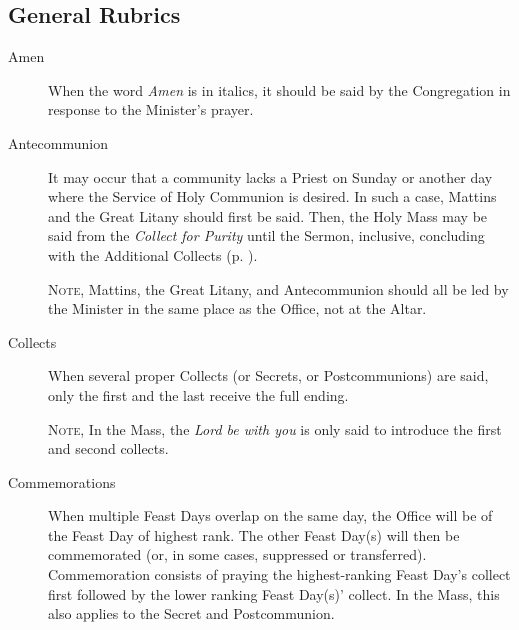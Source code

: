 \subsection{General Rubrics}
\begin{description}
\item[Amen] When the word \emph{Amen} is in italics, it should be said by the Congregation in response to the Minister's prayer.
\item[Antecommunion] It may occur that a community lacks a Priest on Sunday or another day where the Service of Holy Communion is desired. In such a case, Mattins and the Great Litany should first be said. Then, the Holy Mass may be said from the \emph{Collect for Purity} until the Sermon, inclusive, concluding with the Additional Collects (p. \pageref{AdditionalCollects}).\par
\textsc{Note,} Mattins, the Great Litany, and Antecommunion should all be led by the Minister in the same place as the Office, not at the Altar.
\item[Collects] When several proper Collects (or Secrets, or Postcommunions) are said, only the first and the last receive the full ending.\par
	\textsc{Note,} In the Mass, the \emph{Lord be with you} is only said to introduce the first and second collects.
\item[Commemorations] When multiple Feast Days overlap on the same day, the Office will be of the Feast Day of highest rank. The other Feast Day(s) will then be commemorated (or, in some cases, suppressed or transferred). Commemoration consists of praying the highest-ranking Feast Day's collect first followed by the lower ranking Feast Day(s)' collect. In the Mass, this also applies to the Secret and Postcommunion.

\end{description}
